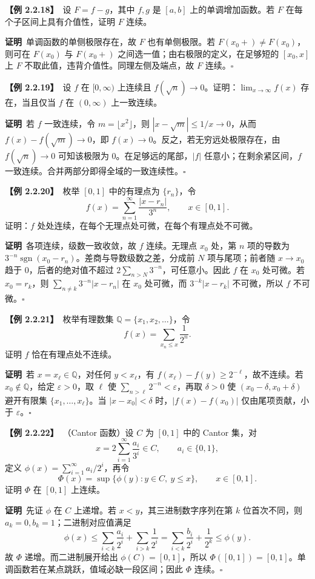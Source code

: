 \documentclass[UTF8,a4paper,11pt]{ctexart}
\newcommand{\ex}[1]{\par\medskip\noindent\textbf{【例 #1】}\ }
\newcommand{\pf}{\par\noindent\textbf{证明}\ }
\begin{document}
\ex{2.2.18}设 $F=f-g$，其中 $f,g$ 是 $[a,b]$ 上的单调增加函数。若 $F$ 在每个子区间上具有介值性，证明 $F$ 连续。
\pf 单调函数的单侧极限存在，故 $F$ 也有单侧极限。若 $F(x_0+)\ne F(x_0)$，则可在 $F(x_0)$ 与 $F(x_0+)$ 之间选一值；由右极限的定义，在足够短的 $[x_0,x]$ 上 $F$ 不取此值，违背介值性。同理左侧及端点，故 $F$ 连续。\hfill$\square$

\ex{2.2.19}设 $f$ 在 $[0,\infty)$ 上连续且 $f(\sqrt n)\to0$。证明：$\lim_{x\to\infty}f(x)$ 存在，当且仅当 $f$ 在 $(0,\infty)$ 上一致连续。
\pf 若 $f$ 一致连续，令 $m=\lfloor x^2\rfloor$，则 $|x-\sqrt m|\le1/x\to0$，从而 $f(x)-f(\sqrt m)\to0$，即 $f(x)\to0$。反之，若无穷远处极限存在，由 $f(\sqrt n)\to0$ 可知该极限为 $0$。在足够远的尾部，$|f|$ 任意小；在剩余紧区间，$f$ 一致连续。合并两部分即得全域的一致连续性。\hfill$\square$

\ex{2.2.20}枚举 $[0,1]$ 中的有理点为 $\{r_n\}$，令
\[
f(x)=\sum_{n=1}^{\infty}\frac{|x-r_n|}{3^n},\qquad x\in[0,1].
\]
证明：$f$ 处处连续，在每个无理点处可微，在每个有理点处不可微。
\pf 各项连续，级数一致收敛，故 $f$ 连续。无理点 $x_0$ 处，第 $n$ 项的导数为 $3^{-n}\operatorname{sgn}(x_0-r_n)$。差商与导数级数之差，分成前 $N$ 项与尾项；前者随 $x\to x_0$ 趋于 $0$，后者的绝对值不超过 $2\sum_{n>N}3^{-n}$，可任意小。因此 $f$ 在 $x_0$ 处可微。若 $x_0=r_k$，则 $\sum_{n\ne k}3^{-n}|x-r_n|$ 在 $x_0$ 处可微，而 $3^{-k}|x-r_k|$ 不可微，所以 $f$ 不可微。\hfill$\square$

\ex{2.2.21}枚举有理数集 $\mathbb Q=\{x_1,x_2,\ldots\}$，令
\[
f(x)=\sum_{x_n\le x}\frac1{2^n}.
\]
证明 $f$ 恰在有理点处不连续。
\pf 若 $x=x_\ell\in\mathbb Q$，对任何 $y<x_\ell$，有 $f(x_\ell)-f(y)\ge2^{-\ell}$，故不连续。若 $x_0\notin\mathbb Q$，给定 $\varepsilon>0$，取 $\ell$ 使 $\sum_{n>\ell}2^{-n}<\varepsilon$，再取 $\delta>0$ 使 $(x_0-\delta,x_0+\delta)$ 避开有限集 $\{x_1,\ldots,x_\ell\}$。当 $|x-x_0|<\delta$ 时，$|f(x)-f(x_0)|$ 仅由尾项贡献，小于 $\varepsilon$。\hfill$\square$

\ex{2.2.22}（Cantor 函数）设 $C$ 为 $[0,1]$ 中的 Cantor 集，对
\[
x=2\sum_{i=1}^{\infty}\frac{a_i}{3^i}\in C,\qquad a_i\in\{0,1\},
\]
定义 $\phi(x)=\sum_{i=1}^{\infty}a_i/2^i$，再令
\[
\Phi(x)=\sup\{\phi(y):y\in C,\ y\le x\},\qquad x\in[0,1].
\]
证明 $\Phi$ 在 $[0,1]$ 上连续。
\pf 先证 $\phi$ 在 $C$ 上递增。若 $x<y$，其三进制数字序列在第 $k$ 位首次不同，则 $a_k=0,b_k=1$；二进制对应值满足
\[
\phi(x)\le\sum_{i<k}\frac{a_i}{2^i}+\sum_{i>k}\frac1{2^i}
=\sum_{i<k}\frac{b_i}{2^i}+\frac1{2^k}\le\phi(y).
\]
故 $\Phi$ 递增。而二进制展开给出 $\phi(C)=[0,1]$，所以 $\Phi([0,1])=[0,1]$。单调函数若在某点跳跃，值域必缺一段区间；因此 $\Phi$ 连续。\hfill$\square$
\end{document}
